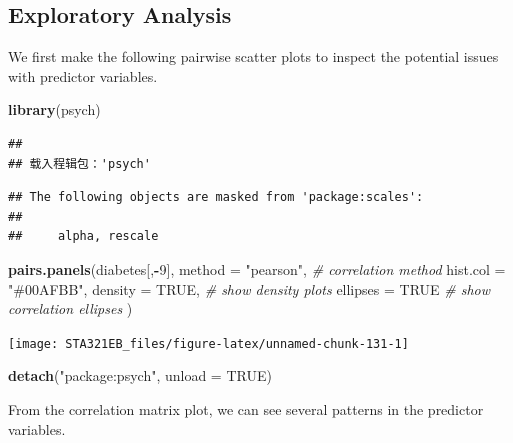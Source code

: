 \documentclass[
]{book}
\newenvironment{Shaded}{\begin{snugshade}}{\end{snugshade}}
\newcommand{\AttributeTok}[1]{\textcolor[rgb]{0.13,0.29,0.53}{#1}}
\newcommand{\CommentTok}[1]{\textcolor[rgb]{0.56,0.35,0.01}{\textit{#1}}}
\newcommand{\ConstantTok}[1]{\textcolor[rgb]{0.56,0.35,0.01}{#1}}
\newcommand{\DecValTok}[1]{\textcolor[rgb]{0.00,0.00,0.81}{#1}}
\newcommand{\FunctionTok}[1]{\textcolor[rgb]{0.13,0.29,0.53}{\textbf{#1}}}
\newcommand{\NormalTok}[1]{#1}
\newcommand{\SpecialCharTok}[1]{\textcolor[rgb]{0.81,0.36,0.00}{\textbf{#1}}}
\newcommand{\StringTok}[1]{\textcolor[rgb]{0.31,0.60,0.02}{#1}}
\begin{document}
\hypertarget{exploratory-analysis}{%
\subsection{Exploratory Analysis}\label{exploratory-analysis}}

We first make the following pairwise scatter plots to inspect the potential issues with predictor variables.

\begin{Shaded}
\begin{Highlighting}[]
\FunctionTok{library}\NormalTok{(psych)}
\end{Highlighting}
\end{Shaded}

\begin{verbatim}
## 
## 载入程辑包：'psych'
\end{verbatim}

\begin{verbatim}
## The following objects are masked from 'package:scales':
## 
##     alpha, rescale
\end{verbatim}

\begin{Shaded}
\begin{Highlighting}[]
\FunctionTok{pairs.panels}\NormalTok{(diabetes[,}\SpecialCharTok{{-}}\DecValTok{9}\NormalTok{], }
             \AttributeTok{method =} \StringTok{"pearson"}\NormalTok{, }\CommentTok{\# correlation method}
             \AttributeTok{hist.col =} \StringTok{"\#00AFBB"}\NormalTok{,}
             \AttributeTok{density =} \ConstantTok{TRUE}\NormalTok{,  }\CommentTok{\# show density plots}
             \AttributeTok{ellipses =} \ConstantTok{TRUE} \CommentTok{\# show correlation ellipses}
\NormalTok{             )}
\end{Highlighting}
\end{Shaded}

\begin{center}\texttt{[image: STA321EB\_files/figure-latex/unnamed-chunk-131-1]} \end{center}

\begin{Shaded}
\begin{Highlighting}[]
\FunctionTok{detach}\NormalTok{(}\StringTok{"package:psych"}\NormalTok{, }\AttributeTok{unload =} \ConstantTok{TRUE}\NormalTok{)}
\end{Highlighting}
\end{Shaded}

From the correlation matrix plot, we can see several patterns in the predictor variables.
\end{document}
